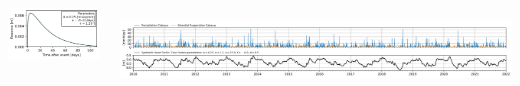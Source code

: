 \documentclass[17pt, a0paper, margin=0mm, innermargin=5mm, blockverticalspace=5mm, colspace=5mm, subcolspace=-15mm]{tikzposter}
\begin{document}
\begin{columns}
{\begin{minipage}{0.3\linewidth}
\begin{tikzfigure}
        \includegraphics[width=\linewidth, height=60mm, keepaspectratio]{fig/gamma_response.png}
    \end{tikzfigure}
\end{minipage}
\vspace{-5mm}
\begin{tikzfigure}\label{fig:meteo_series}
    \includegraphics[width=18in, height=2.7in, keepaspectratio]{fig/meteo_series.png}
\end{tikzfigure}
\vspace{-12mm}
}


\end{columns}
\end{document}
